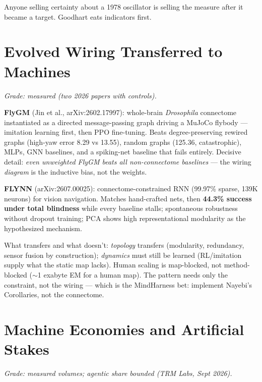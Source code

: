 \documentclass[11pt]{article}
\begin{document}
Anyone selling certainty about a 1978 oscillator is selling the measure after it became a target. Goodhart eats indicators first.

\section{Evolved Wiring Transferred to Machines}
\label{sec:fly}

\textit{Grade: measured (two 2026 papers with controls).}

\textbf{FlyGM} (Jin et al., arXiv:2602.17997): whole-brain \textit{Drosophila} connectome instantiated as a directed message-passing graph driving a MuJoCo flybody --- imitation learning first, then PPO fine-tuning. Beats degree-preserving rewired graphs (high-yaw error 8.29 vs 13.55), random graphs (125.36, catastrophic), MLPs, GNN baselines, and a spiking-net baseline that fails entirely. Decisive detail: \emph{even unweighted FlyGM beats all non-connectome baselines} --- the wiring \emph{diagram} is the inductive bias, not the weights.

\textbf{FLYNN} (arXiv:2607.00025): connectome-constrained RNN (99.97\% sparse, 139K neurons) for vision navigation. Matches hand-crafted nets, then \textbf{44.3\% success under total blindness} while every baseline stalls; spontaneous robustness without dropout training; PCA shows high representational modularity as the hypothesized mechanism.

What transfers and what doesn't: \emph{topology} transfers (modularity, redundancy, sensor fusion by construction); \emph{dynamics} must still be learned (RL/imitation supply what the static map lacks). Human scaling is map-blocked, not method-blocked ($\sim$1 exabyte EM for a human map). The pattern needs only the constraint, not the wiring --- which is the MindHarness bet: implement Nayebi's Corollaries, not the connectome.

\section{Machine Economies and Artificial Stakes}
\label{sec:agents}

\textit{Grade: measured volumes; agentic share bounded (TRM Labs, Sept 2026).}
\end{document}
